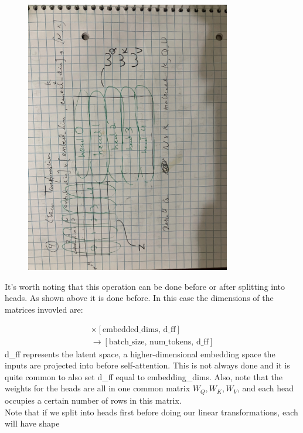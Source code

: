\documentclass[12pt]{article}
\begin{document}
\begin{enumerate}
\begin{figure}[H]
    \centering
    \includegraphics[width=0.8\textwidth, angle=180]{./linear_2.jpg}
\end{figure}

It's worth noting that this operation can be done before or after splitting into heads. As shown above it is done before. In this case the dimensions of the matrices invovled are:

\begin{align*}
[\text{batch\_size, num\_tokens, embedded\_dims}] \times [\text{embedded\_dims, d\_ff}] \\
\rightarrow [\text{batch\_size, num\_tokens, d\_ff}]
\end{align*}
d\_ff represents the latent space, a higher-dimensional embedding space the inputs are projected into before self-attention. This is not always done and it is quite common to also set d\_ff equal to embedding\_dims. Also, note that the weights for the heads are all in one common matrix \(W_Q, W_K, W_V\), and each head occupies a certain number of rows in this matrix.\\

Note that if we split into heads first before doing our linear transformations, each will have shape


\end{enumerate}
\end{document}
